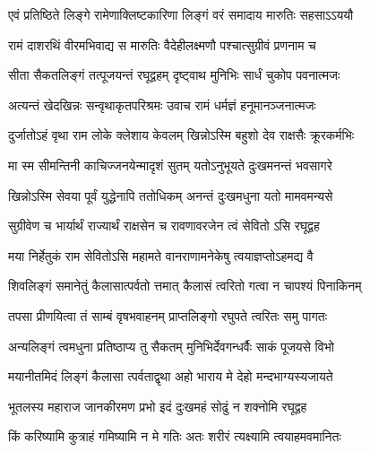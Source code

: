 \vakta{}
\shrota{}
\tags{}
\notes{}

\storymeta





\twolineshloka
{एवं प्रतिष्ठिते लिङ्गे रामेणाक्लिष्टकारिणा}
{लिङ्गं वरं समादाय मारुतिः सहसाऽऽययौ}%

\twolineshloka
{रामं दाशरथिं वीरमभिवाद्य स मारुतिः}
{वैदेहीलक्ष्मणौ पश्चात्सुग्रीवं प्रणनाम च}%

\twolineshloka
{सीता सैकतलिङ्गं तत्पूजयन्तं रघूद्वहम्}
{दृष्ट्वाथ मुनिभिः सार्धं चुकोप पवनात्मजः}%

\twolineshloka
{अत्यन्तं खेदखिन्नः सन्वृथाकृतपरिश्रमः}
{उवाच रामं धर्मज्ञं हनूमानञ्जनात्मजः}%


\twolineshloka
{दुर्जातोऽहं वृथा राम लोके क्लेशाय केवलम्}
{खिन्नोऽस्मि बहुशो देव राक्षसैः क्रूरकर्मभिः}%

\twolineshloka
{मा स्म सीमन्तिनी काचिज्जनयेन्मादृशं सुतम्}
{यतोऽनुभूयते दुःखमनन्तं भवसागरे}%

\twolineshloka
{खिन्नोऽस्मि सेवया पूर्वं युद्धेनापि ततोधिकम्}
{अनन्तं दुःखमधुना यतो मामवमन्यसे}%

\twolineshloka
{सुग्रीवेण च भार्यार्थं राज्यार्थं राक्षसेन च}
{रावणावरजेन त्वं सेवितो ऽसि रघूद्वह}%

\twolineshloka
{मया निर्हेतुकं राम सेवितोऽसि महामते}
{वानराणामनेकेषु त्वयाज्ञप्तोऽहमद्य वै}%

\twolineshloka
{शिवलिङ्गं समानेतुं कैलासात्पर्वतो त्तमात्}
{कैलासं त्वरितो गत्वा न चापश्यं पिनाकिनम्}%

\twolineshloka
{तपसा प्रीणयित्वा तं साम्बं वृषभवाहनम्}
{प्राप्तलिङ्गो रघुपते त्वरितः समु पागतः}%

\twolineshloka
{अन्यलिङ्गं त्वमधुना प्रतिष्ठाप्य तु सैकतम्}
{मुनिभिर्देवगन्धर्वैः साकं पूजयसे विभो}%

\twolineshloka
{मयानीतमिदं लिङ्गं कैलासा त्पर्वताद्वृथा}
{अहो भाराय मे देहो मन्दभाग्यस्यजायते}%

\twolineshloka
{भूतलस्य महाराज जानकीरमण प्रभो}
{इदं दुःखमहं सोढुं न शक्नोमि रघूद्वह}%

\twolineshloka
{किं करिष्यामि कुत्राहं गमिष्यामि न मे गतिः}
{अतः शरीरं त्यक्ष्यामि त्वयाहमवमानितः}%


